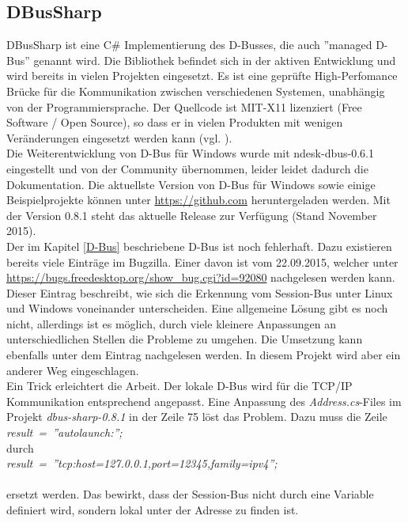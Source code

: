 \subsection{DBusSharp}
DBusSharp ist eine C\# Implementierung des D-Busses, die auch ''managed D-Bus'' genannt wird. Die Bibliothek befindet sich in der aktiven Entwicklung und wird bereits in vielen Projekten eingesetzt. Es ist eine geprüfte High-Perfomance Brücke für die Kommunikation zwischen verschiedenen Systemen, unabhängig von der Programmiersprache. Der Quellcode ist MIT-X11 lizenziert (Free Software / Open Source), so dass er in vielen Produkten mit wenigen Veränderungen eingesetzt werden kann (vgl. \cite[Web]{WebDBusSharp2015}).\\
Die Weiterentwicklung von D-Bus für Windows wurde mit ndesk-dbus-0.6.1 eingestellt und von der Community übernommen, leider leidet dadurch die Dokumentation. Die aktuellste Version von D-Bus für Windows sowie einige Beispielprojekte können unter \url{https://github.com} heruntergeladen werden.
Mit der Version 0.8.1 steht das aktuelle Release zur Verfügung (Stand November 2015). \\
Der im Kapitel \ref{D-Bus} beschriebene D-Bus ist noch fehlerhaft. Dazu existieren bereits viele Einträge im Bugzilla. Einer davon ist vom 22.09.2015, welcher unter \url{https://bugs.freedesktop.org/show_bug.cgi?id=92080} nachgelesen werden kann. Dieser Eintrag beschreibt, wie sich die Erkennung vom Session-Bus unter Linux und Windows voneinander unterscheiden. Eine allgemeine Lösung gibt es noch nicht, allerdings ist es möglich, durch viele kleinere Anpassungen an unterschiedlichen Stellen die Probleme zu umgehen. Die Umsetzung kann ebenfalls unter dem Eintrag nachgelesen werden. In diesem Projekt wird aber ein anderer Weg eingeschlagen. \\
Ein Trick erleichtert die Arbeit. Der lokale D-Bus wird für die TCP/IP Kommunikation entsprechend angepasst. Eine Anpassung des \textit{Address.cs}-Files im Projekt \textit{dbus-sharp-0.8.1} in der Zeile 75 löst das Problem. Dazu muss die Zeile \newpage \mbox{\textit{result = ''autolaunch:'';}} \\ durch\\ \mbox{\textit{result = ''tcp:host=127.0.0.1,port=12345,family=ipv4'';}}\\\\ ersetzt werden. Das bewirkt, dass der Session-Bus nicht durch eine Variable definiert wird, sondern lokal unter der Adresse zu finden ist. 


